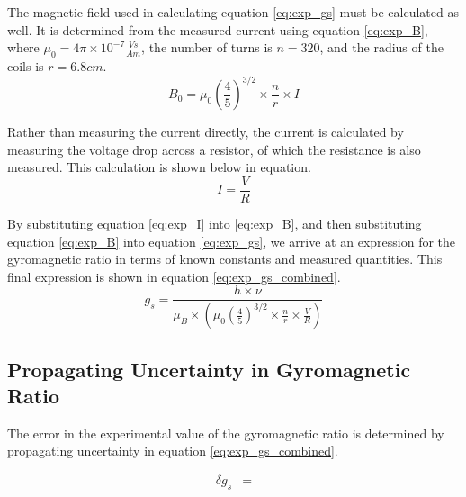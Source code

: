 \documentclass[a4paper]{article}
\begin{document}
\qq The magnetic field used in calculating equation \ref{eq:exp_gs} must be calculated as well. It is determined from the measured current using equation \ref{eq:exp_B}, where $\mu_0 = 4 \pi \times 10^{-7} \frac{Vs}{Am}$, the number of turns is $n=320$, and the radius of the coils is $r=6.8cm$.
\begin{equation}
\label{eq:exp_B}
B_0 = \mu_0 \left( \frac{4}{5} \right) ^{3/2} \times \frac{n}{r} \times I
\end{equation}

\qq Rather than measuring the current directly, the current is calculated by measuring the voltage drop across a resistor, of which the resistance is also measured. This calculation is shown below in equation.
\begin{equation}
\label{eq:exp_I}
I = \frac{V}{R}
\end{equation}

\qq By substituting equation \ref{eq:exp_I} into \ref{eq:exp_B}, and then substituting equation \ref{eq:exp_B} into equation \ref{eq:exp_gs}, we arrive at an expression for the gyromagnetic ratio in terms of known constants and measured quantities. This final expression is shown in equation \ref{eq:exp_gs_combined}.
\begin{equation}
\label{eq:exp_gs_combined}
g_s = \frac{h \times \nu}{\mu_B \times \left( \mu_0 \left( \frac{4}{5} \right) ^{3/2} \times \frac{n}{r} \times \frac{V}{R} \right) }
\end{equation}

\subsection{Propagating Uncertainty in Gyromagnetic Ratio}
\qq The error in the experimental value of the gyromagnetic ratio is determined by propagating uncertainty in equation \ref{eq:exp_gs_combined}.

\begin{align*}
\delta g_s &= \\
\end{align*}
\end{document}
